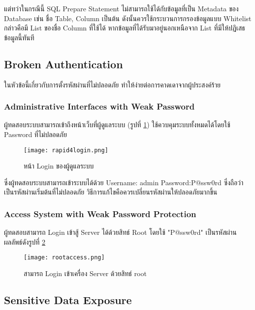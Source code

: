 แต่ทว่าในกรณีนี้ SQL Prepare Statement ไม่สามารถใช้ได้กับข้อมูลที่เป็น Metadata ของ Database เช่น ชื่อ Table, Column เป็นต้น ดังนั้นควรใช้กระบวนการกรองข้อมูลแบบ Whitelist กล่าวคือมี List ของชื่อ Column ที่ใช้ได้ หากข้อมูลที่ได้รับมาอยู่นอกเหนือจาก List ที่มีให้ปฏิเสธข้อมูลนี้ทันที

\subsection{Broken Authentication}

ในหัวข้อนี้เกี่ยวกับการตั้งรหัสผ่านที่ไม่ปลอดภัย ทำให้ง่ายต่อการคาดเดาจากผู้ประสงค์ร้าย

\subsubsection{Administrative Interfaces with Weak Password}

ผู้ทดสอบระบบสามารถเข้าถึงหน้าเว็บที่ผู้ดูแลระบบ (รูปที่  \ref{Fig:rapid4login.png}) ใช้ควบคุมระบบทั้งหมดได้โดยใช้ Password ที่ไม่ปลอดภัย

 \begin{figure}[h]
	\centering
	\texttt{[image: rapid4login.png]}
	\caption{หน้า Login ของผู้ดูแลระบบ}
	\label{Fig:rapid4login.png}
\end{figure}

ซึ่งผู้ทดสอบระบบสามารถเข้าระบบได้ด้วย Username: admin Password:P@ssw0rd ซึ่งถือว่าเป็นรหัสผ่านเริ่มต้นที่ไม่ปลอดภัย วิธีการแก้ไขคือควรเปลี่ยนรหัสผ่านให้ปลอดภัยมากขึ้น

\subsubsection{Access System with Weak Password Protection}

ผู้ทดสอบสามารถ Login เข้าสู้ Server ได้ด้วยสิทธ์ Root โดยใช้ "P@ssw0rd" เป็นรหัสผ่าน ผลลัพธ์ดังรูปที่ \ref{Fig:rootaccess.png}

 \begin{figure}[h]
	\centering
	\texttt{[image: rootaccess.png]}
	\caption{สามารถ Login เข้าเครื่อง Server ด้วยสิทธ์ root}
	\label{Fig:rootaccess.png}
\end{figure}

\subsection{Sensitive Data Exposure}

